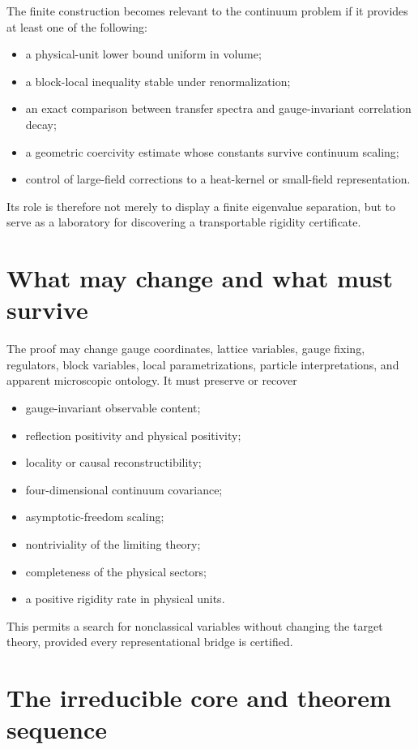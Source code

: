 \documentclass[11pt]{article}
\theoremstyle{remark}
\begin{document}
The finite construction becomes relevant to the continuum problem if it
provides at least one of the following:
\begin{itemize}[leftmargin=2em]
  \item a physical-unit lower bound uniform in volume;
  \item a block-local inequality stable under renormalization;
  \item an exact comparison between transfer spectra and gauge-invariant
        correlation decay;
  \item a geometric coercivity estimate whose constants survive continuum
        scaling;
  \item control of large-field corrections to a heat-kernel or small-field
        representation.
\end{itemize}
Its role is therefore not merely to display a finite eigenvalue separation, but
to serve as a laboratory for discovering a transportable rigidity certificate.

\section{What may change and what must survive}

The proof may change gauge coordinates, lattice variables, gauge fixing,
regulators, block variables, local parametrizations, particle interpretations,
and apparent microscopic ontology.  It must preserve or recover
\begin{itemize}[leftmargin=2em]
  \item gauge-invariant observable content;
  \item reflection positivity and physical positivity;
  \item locality or causal reconstructibility;
  \item four-dimensional continuum covariance;
  \item asymptotic-freedom scaling;
  \item nontriviality of the limiting theory;
  \item completeness of the physical sectors;
  \item a positive rigidity rate in physical units.
\end{itemize}
This permits a search for nonclassical variables without changing the target
theory, provided every representational bridge is certified.

\section{The irreducible core and theorem sequence}
\end{document}

